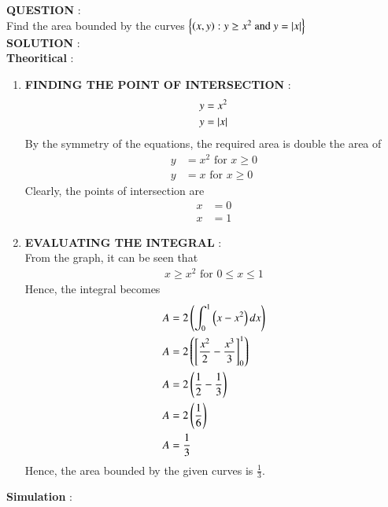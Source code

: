 \documentclass[journal]{IEEEtran}
\begin{document}
\textbf{QUESTION} : \\
Find the area bounded by the curves $\left\{\left(x,y\right) : y \geq x^2  \text{ and } y = \left\vert x\right\vert \right\}$ \\
\textbf{SOLUTION} : \\
\textbf{Theoritical} : \\
\begin{enumerate}
	\item \textbf{FINDING THE POINT OF INTERSECTION} : \\
		\begin{align}
			y &= x^2 \\
			y &= \left\vert x\right\vert
		\end{align}
		By the symmetry of the equations, the required area is double the area of 
		\begin{align}
			y &= x^2 \text{ for } x \geq 0 \\
			y &= x \text{ for } x \geq 0 
		\end{align}
		Clearly, the points of intersection are 
		\begin{align}
			x &= 0 \\
			x &= 1 
		\end{align}
	\item \textbf{EVALUATING THE INTEGRAL } : \\
	From the graph, it can be seen that 
	\begin{align}
		x \geq x^2 \text{ for } 0 \leq x \leq 1
	\end{align}
	Hence, the integral becomes
	\begin{align}
		A &= 2 \left( \int_{0}^{1} \left(x - x^2\right) dx \right)\\
		A &= 2 \left( \left[ \frac{x^2}{2} - \frac{x^3}{3} \right]_{0}^{1} \right) \\
		A &= 2 \left( \frac{1}{2} - \frac{1}{3} \right)\\
		A &= 2 \left( \frac{1}{6} \right) \\
		A &= \frac{1}{3}
	\end{align}
	Hence, the area bounded by the given curves is $\frac{1}{3}$. \\
\end{enumerate}
\textbf{Simulation } : 
\end{document}
